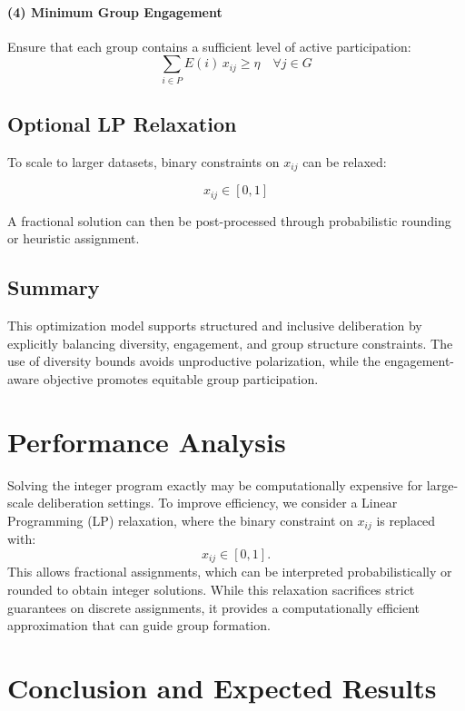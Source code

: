 \documentclass[11pt,a4paper]{article}
\begin{document}
\paragraph{(4) Minimum Group Engagement}
Ensure that each group contains a sufficient level of active participation:
\[
\sum_{i \in P} E(i)\,x_{ij} \geq \eta \quad \forall j \in G
\]

\subsection{Optional LP Relaxation}

To scale to larger datasets, binary constraints on $x_{ij}$ can be relaxed:

\[
x_{ij} \in [0,1]
\]

A fractional solution can then be post-processed through probabilistic rounding or heuristic assignment.

\subsection{Summary}

This optimization model supports structured and inclusive deliberation by explicitly balancing diversity, engagement, and group structure constraints. The use of diversity bounds avoids unproductive polarization, while the engagement-aware objective promotes equitable group participation.


\section{Performance Analysis}

Solving the integer program exactly may be computationally expensive for large-scale deliberation settings. To improve efficiency, we consider a Linear Programming (LP) relaxation, where the binary constraint on \( x_{ij} \) is replaced with:
\begin{equation}
    x_{ij} \in [0,1].
\end{equation}
This allows fractional assignments, which can be interpreted probabilistically or rounded to obtain integer solutions. While this relaxation sacrifices strict guarantees on discrete assignments, it provides a computationally efficient approximation that can guide group formation.

\section{Conclusion and Expected Results}
\end{document}
